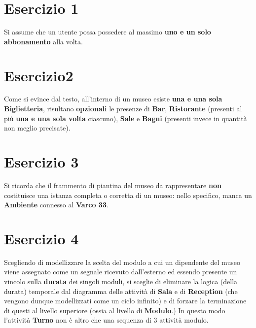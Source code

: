 \documentclass[10pt, italian, openany, landscape]{book}
\newcommand*{\MyIncludeGraphics}[2][]{%
\begin{adjustbox}{max size={0.8\textwidth}{\textheight}}
    \texttt{[image: \#2]}%
\end{adjustbox}
}
\begin{document}

\section{Esercizio 1}
Si assume che un utente possa possedere al massimo \textbf{uno e un solo abbonamento} alla volta.


\pagebreak
\section{Esercizio2}
Come si evince dal testo, all'interno di un museo esiste \textbf{una e una sola Biglietteria}, risultano \textbf{opzionali}
le presenze di \textbf{Bar}, \textbf{Ristorante} (presenti al pi\`u \textbf{una e una sola volta} ciascuno), \textbf{Sale} e \textbf{Bagni} (presenti invece
in quantit\`a non meglio precisate).



\pagebreak

\section{Esercizio 3}
Si ricorda che il frammento di piantina del museo da rappresentare \textbf{non} costituisce una istanza completa
o corretta di un museo: nello specifico, manca un \textbf{Ambiente} connesso al \textbf{Varco 33}.



\pagebreak

\section{Esercizio 4}
Scegliendo di modellizzare la scelta del modulo a cui un dipendente del museo viene assegnato come
un segnale ricevuto dall'esterno ed essendo presente un vincolo sulla \textbf{durata} dei singoli moduli, si sceglie
di eliminare la logica (della durata) temporale dal diagramma delle attivit\`a di \textbf{Sala} e di \textbf{Reception} (che vengono
dunque modellizzati come un ciclo infinito) e di forzare la terminazione di questi al livello superiore (ossia al livello di \textbf{Modulo}.)
In questo modo l'attivit\`a \textbf{Turno} non \`e altro che una sequenza di 3 attivit\`a modulo.
\end{document}

